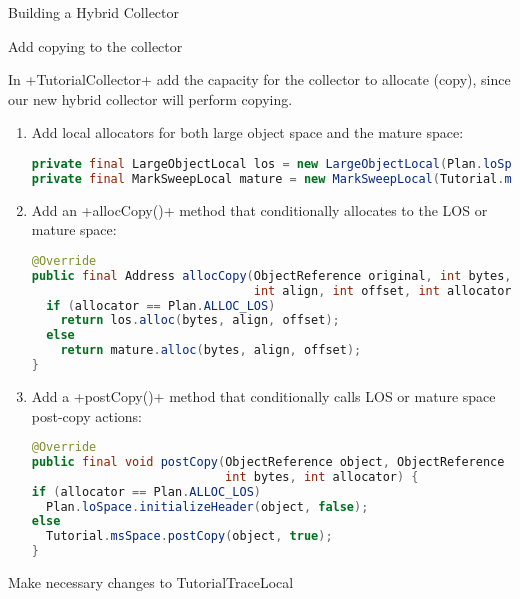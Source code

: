 \begin{chapter}{Building a Hybrid Collector}
\begin{section}{Add copying to the collector}

In \spverb+TutorialCollector+ add the capacity for the collector to allocate (copy), since our new hybrid collector will perform copying.

\begin{enumerate}
  \item Add local allocators for both large object space and the mature space:
    \begin{lstlisting}[language=Java]
private final LargeObjectLocal los = new LargeObjectLocal(Plan.loSpace);
private final MarkSweepLocal mature = new MarkSweepLocal(Tutorial.msSpace);
    \end{lstlisting}
  \item Add an \spverb+allocCopy()+ method that conditionally allocates to the LOS or mature space:
    \begin{lstlisting}[language=Java]
@Override
public final Address allocCopy(ObjectReference original, int bytes,
                               int align, int offset, int allocator) {
  if (allocator == Plan.ALLOC_LOS)
    return los.alloc(bytes, align, offset);
  else
    return mature.alloc(bytes, align, offset);
}
    \end{lstlisting}
  \item Add a \spverb+postCopy()+ method that conditionally calls LOS or mature space post-copy actions:
    \begin{lstlisting}[language=Java]
@Override
public final void postCopy(ObjectReference object, ObjectReference typeRef,
                           int bytes, int allocator) {
if (allocator == Plan.ALLOC_LOS)
  Plan.loSpace.initializeHeader(object, false);
else
  Tutorial.msSpace.postCopy(object, true);
}
    \end{lstlisting}
\end{enumerate}

\end{section}

\begin{section}{Make necessary changes to TutorialTraceLocal}


\end{section}
\end{chapter}
